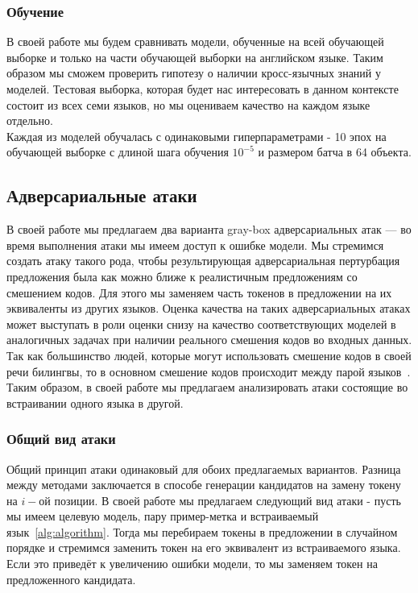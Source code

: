 \subsubsection{Обучение}
В своей работе мы будем сравнивать модели, обученные на всей обучающей выборке и только на части обучающей выборки на английском языке.
Таким образом мы сможем проверить гипотезу о наличии кросс-язычных знаний у моделей.
Тестовая выборка, которая будет нас интересовать в данном контексте состоит из всех семи языков, но мы оцениваем качество на каждом языке отдельно. \\
Каждая из моделей обучалась с одинаковыми гиперпараметрами - 10 эпох на обучающей выборке с длиной шага обучения $10^{-5}$ и размером батча в 64 объекта.

\subsection{Адверсариальные атаки}
В своей работе мы предлагаем два варианта gray-box адверсариальных атак — во время выполнения атаки мы имеем доступ к ошибке модели.
Мы стремимся создать атаку такого рода, чтобы результирующая адверсариальная пертурбация предложения была как можно ближе к реалистичным предложениям со смешением кодов.
Для этого мы заменяем часть токенов в предложении на их эквиваленты из других языков.
Оценка качества на таких адверсариальных атаках может выступать в роли оценки снизу на качество соответствующих моделей в аналогичных задачах при наличии реального смешения кодов во входных данных. \\
Так как большинство людей, которые могут использовать смешение кодов в своей речи билингвы, то в основном смешение кодов происходит между парой языков~\cite{bilinguals}.
Таким образом, в своей работе мы предлагаем анализировать атаки состоящие во встраивании одного языка в другой.

\subsubsection{Общий вид атаки}
Общий принцип атаки одинаковый для обоих предлагаемых вариантов.
Разница между методами заключается в способе генерации кандидатов на замену токену на $i-$ой позиции.
В своей работе мы предлагаем следующий вид атаки - пусть мы имеем целевую модель, пару пример-метка и встраиваемый язык~\eqref{alg:algorithm}.
Тогда мы перебираем токены в предложении в случайном порядке и стремимся заменить токен на его эквивалент из встраиваемого языка.
Если это приведёт к увеличению ошибки модели, то мы заменяем токен на предложенного кандидата.


